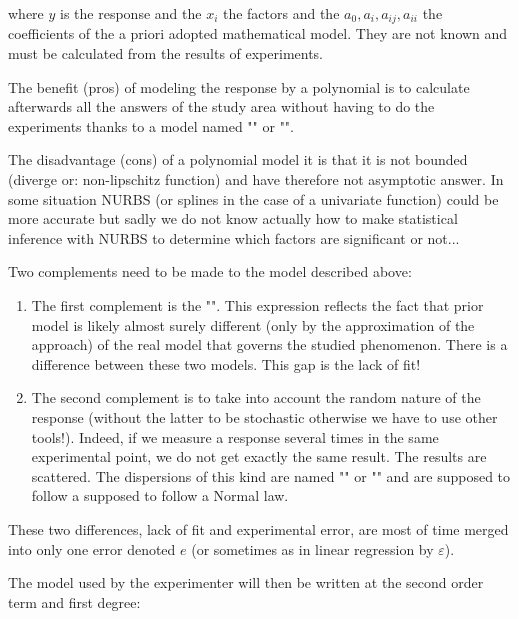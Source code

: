 	where $y$ is the response and the $x_i$ the factors and the $a_0,a_i,a_{ij},a_{ii}$ the coefficients of the a priori adopted mathematical model. They are not known and must be calculated from the results of experiments.
	
	The benefit (pros) of modeling the response by a polynomial is to calculate afterwards all the answers of the study area without having to do the experiments thanks to a model named "" or "".
	
	The disadvantage (cons) of a polynomial model it is that it is not bounded (diverge or: non-lipschitz function) and have therefore not asymptotic answer. In some situation NURBS (or splines in the case of a univariate function) could be more accurate but sadly we do not know actually how to make statistical inference with NURBS  to determine which factors are significant or not...
	
	Two complements need to be made to the model described above:
	\begin{enumerate}
		\item The first complement is the "". This expression reflects the fact that prior model is likely almost surely different (only by the approximation of the approach) of the real model that governs the studied phenomenon. There is a difference between these two models. This gap is the lack of fit!

		\item The second complement is to take into account the random nature of the response (without the latter to be stochastic otherwise we have to use other tools!). Indeed, if we measure a response several times in the same experimental point, we do not get exactly the same result. The results are scattered. The dispersions of this kind are named "" or "" and are supposed to follow a supposed to follow a Normal law.
	\end{enumerate}
	These two differences, lack of fit and experimental error, are most of time merged into only one error denoted $e$ (or sometimes as in linear regression by $\varepsilon$).
	
	The model used by the experimenter will then be written at the second order term and first degree:
	
